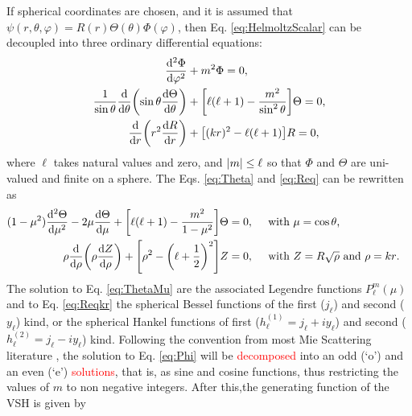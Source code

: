 If spherical coordinates are chosen, and it is assumed that $\psi(r,\theta,\varphi) = R(r)\Theta(\theta)\Phi(\varphi)$, then Eq. \eqref{eq:HelmoltzScalar} can be decoupled into three ordinary differential equations:
%
 \begin{align}
	\dv[2]{\Phi}{\varphi} &+ m^2 \Phi =0,
 		\label{eq:Phi}\\
	\frac{1}{\sin\theta}\dv{\theta}\qty(\sin\theta\dv{\Theta}{\theta}) &+ \qty[\ell(\ell+1)- \frac{m^2}{\sin^2\theta}]\Theta =0,
		\label{eq:Theta}\\
	\dv{r}\qty(r^2\dv{R}{r}) &+ \qty[ (k r)^2 - \ell (\ell +1)] R =0,
 		\label{eq:Req}
\end{align}
%
where $\ell$ takes natural values and zero, and $\abs{m}\leq \ell$ so that $\Phi$ and $\Theta$ are uni-valued and finite on a sphere. The Eqs. \eqref{eq:Theta} and \eqref{eq:Req} can be rewritten as
%
 \begin{align}
(1-\mu^2)\dv[2]{\Theta}{\mu} - 2\mu\dv{\Theta}{\mu} + \qty[\ell(\ell+1)-\frac{m^2}{1-\mu^2}]\Theta &= 0, \qqtext{ with $\mu = \cos\theta$,}
	\label{eq:ThetaMu}\\
	\rho\dv{\rho}\qty(\rho\dv{Z}{\rho}) +  \qty[\rho^2 - \qty(\ell + \frac12)^2]Z  &= 0,  \qqtext{ with $Z = R\sqrt{\rho}$ and $\rho = kr$.}
\label{eq:Reqkr}
\end{align}
%
The solution to Eq. \eqref{eq:ThetaMu} are the associated Legendre functions $ P_\ell^m(\mu)$ and to Eq. \eqref{eq:Reqkr} the spherical Bessel functions of the first ($j_\ell$)  and second ($y_\ell$) kind, or the spherical Hankel functions of first ($h_\ell^{(1)} = j_\ell + iy_\ell$) and second ( $h_\ell^{(2)} = j_\ell - iy_\ell$)  kind. Following the convention from most Mie Scattering literature \cite{zangwill_modern_2013}, the solution to Eq. \eqref{eq:Phi} will be \textcolor{red}{decomposed} into an odd (`o') and an even (`e') \textcolor{red}{solutions}, that is, as sine and cosine functions, thus restricting the values of $m$ to non negative integers. After this,the generating function of the VSH is given by
%
%
%
%
